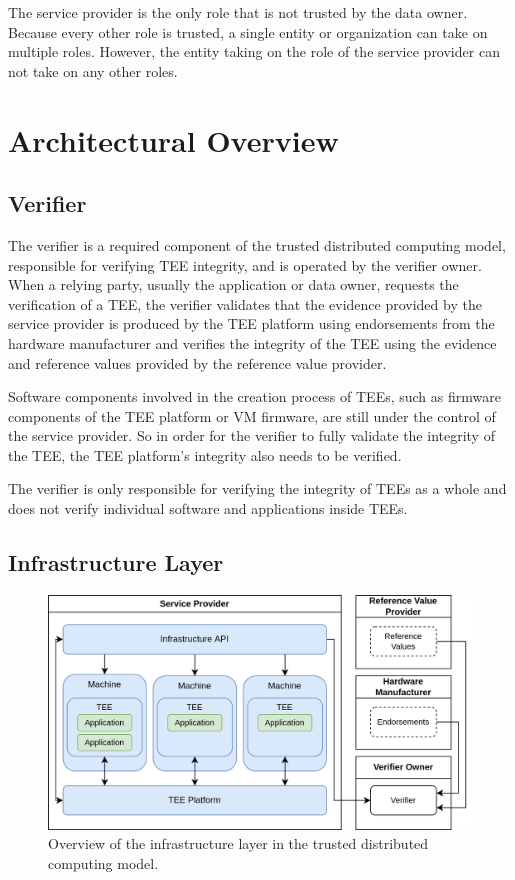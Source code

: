 The service provider is the only role that is not trusted by the data owner.
Because every other role is trusted, a single entity or organization can take on
multiple roles. However, the entity taking on the role of the service provider
can not take on any other roles.

\section{Architectural Overview}
\label{sec:trusted-architecture-overview}

\subsection{Verifier}

The verifier is a required component of the trusted distributed computing model,
responsible for verifying TEE integrity, and is operated by the verifier owner.
When a relying party, usually the application or data owner, requests the
verification of a TEE, the verifier validates that the evidence provided by the
service provider is produced by the TEE platform using endorsements from the
hardware manufacturer and verifies the integrity of the TEE using the evidence
and reference values provided by the reference value provider.

Software components involved in the creation process of TEEs, such as firmware
components of the TEE platform or VM firmware, are still under the control of
the service provider. So in order for the verifier to fully validate the
integrity of the TEE, the TEE platform's integrity also needs to be verified.

The verifier is only responsible for verifying the integrity of TEEs as a whole
and does not verify individual software and applications inside TEEs.

\subsection{Infrastructure Layer}

\begin{figure}[H]
  \centering
  \includegraphics[width=0.9\linewidth]{resources/untrusted-infrastructure-architecture.drawio.png}
  \caption{Overview of the infrastructure layer in the trusted distributed computing model.}
  \label{fig:untrusted-architecture-overview}
\end{figure}

